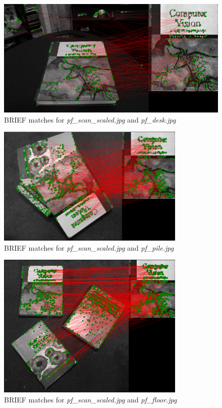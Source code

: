 \documentclass[a4paper]{article}
\begin{document}
\begin{figure}[!htb]
    \centering
    \includegraphics[width=\textwidth]{images/pf_desk}
    \caption{BRIEF matches for \textit{pf\_scan\_scaled.jpg} and \textit{pf\_desk.jpg}}
\end{figure}

\begin{figure}[!htb]
    \centering
    \includegraphics[width=0.8\textwidth]{images/pf_pile}
    \caption{BRIEF matches for \textit{pf\_scan\_scaled.jpg} and \textit{pf\_pile.jpg}}
\end{figure}

\begin{figure}[!htb]
    \centering
    \includegraphics[width=0.8\textwidth]{images/pf_floor}
    \caption{BRIEF matches for \textit{pf\_scan\_scaled.jpg} and \textit{pf\_floor.jpg}}
\end{figure}
\end{document}
